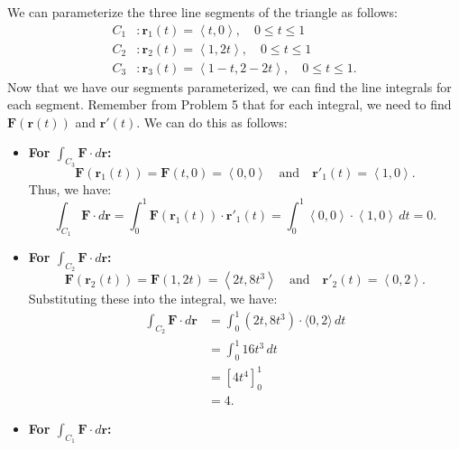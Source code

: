 \documentclass[11pt]{article}
\newcommand{\mb}[1]{\mathbf{#1}}
\begin{document}
\begin{enumerate}
{        We can parameterize the three line segments of the triangle as follows:
        \begin{align*}
            C_{1} &: \mb{r}_{1}(t) = \left \langle t, 0 \right \rangle, \quad 0 \leq t \leq 1 \\
            C_{2} &: \mb{r}_{2}(t) = \left \langle 1, 2t \right \rangle, \quad 0 \leq t \leq 1 \\
            C_{3} &: \mb{r}_{3}(t) = \left \langle 1 - t, 2 - 2t \right \rangle, \quad 0 \leq t \leq 1.
        \end{align*}
        Now that we have our segments parameterized, we can find the line integrals for each segment. Remember from Problem 5 that for each integral, we need to find \(\mb{F}(\mb{r}(t))\) and \(\mb{r}'(t)\). We can do this as follows:
        \begin{itemize}
            \item \textbf{For \(\displaystyle \int_{C_{3}} \mb{F} \cdot d\mb{r}\):}
            \[
                \mb{F}(\mb{r}_{1}(t)) = \mb{F}(t,0) = \left \langle 0, 0 \right \rangle \quad \text{and} \quad \mb{r}'_{1}(t) = \left \langle 1, 0 \right \rangle.
            \]
            Thus, we have:
            \[
                \int_{C_{1}} \mb{F} \cdot d\mb{r} = \int_{0}^{1} \mb{F}(\mb{r}_{1}(t)) \cdot \mb{r}'_{1}(t) = \int_{0}^{1} \left \langle 0, 0 \right \rangle \cdot \left \langle 1, 0 \right \rangle \, dt = 0.
            \]
            \item \textbf{For \(\displaystyle \int_{C_{2}} \mb{F} \cdot d\mb{r}\):}
            \[
                \mb{F}(\mb{r}_{2}(t)) = \mb{F}(1,2t) = \left \langle 2t, 8t^{3} \right \rangle \quad \text{and} \quad \mb{r}'_{2}(t) = \left \langle 0, 2 \right \rangle.
            \]
            Substituting these into the integral, we have:
            \begin{align*}
                \int_{C_{2}} \mb{F} \cdot d\mb{r} &= \int_{0}^{1} (2t, 8t^{3}) \cdot \langle 0, 2 \rangle \, dt \\
                &= \int_{0}^{1} 16t^{3} \, dt \\
                &= \left[4t^{4}\right]_{0}^{1} \\
                &= 4.
            \end{align*}
            \item \textbf{For \(\displaystyle \int_{C_{1}} \mb{F} \cdot d\mb{r}\):} \\
            

\end{itemize}}
\end{enumerate}
\end{document}
